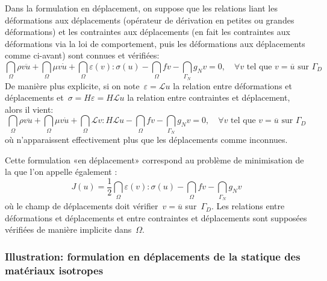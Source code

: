\medskip
Dans la formulation en déplacement, on suppose que les relations liant les déformations aux déplacements (opérateur de dérivation en petites ou grandes déformations) et les contraintes aux déplacements (en fait les contraintes aux déformations via la loi de comportement, puis les déformations aux déplacements comme ci-avant) sont connues et vérifiées:
\begin{equation}
\dint_\Omega \rho v\ddot{u} + \dint_\Omega \mu v\dot{u}
+\dint_\Omega \varepsilon(v):\sigma(u) - \dint_\Omega fv
-\dint_{\Gamma_N} g_N v =0, \quad \forall v \text{ tel que } v=\overline{u} \text{ sur } \Gamma_D
\end{equation}
De manière plus explicite, si on note~$\varepsilon=\mathcal{L}u$ la relation entre déformations et déplacements et~$\sigma = H\varepsilon = H\mathcal{L}u$ la relation entre contraintes et déplacement, alors il vient:
\begin{equation}
\dint_\Omega \rho v\ddot{u} + \dint_\Omega \mu v\dot{u}
+\dint_\Omega \mathcal{L}v:H\mathcal{L}u - \dint_\Omega fv
-\dint_{\Gamma_N} g_N v =0, \quad \forall v \text{ tel que } v=\overline{u} \text{ sur } \Gamma_D
\end{equation}
où n'apparaissent effectivement plus que les déplacements comme inconnues.


\medskip
Cette formulation «en déplacement» correspond au problème de minimisation de la  que l'on appelle également :
\begin{equation}
J(u)=
\frac12 \dint_\Omega \varepsilon(v):\sigma(u) - \dint_\Omega fv -
\dint_{\Gamma_N} g_N v
\end{equation}
où le champ de déplacements doit vérifier~$v=\overline{u}$ sur~$\Gamma_D$.
Les relations entre déformations et déplacements et entre contraintes et déplacements sont supposées vérifiées de manière implicite dans~$\Omega$.

\medskip
\subsubsection{Illustration: formulation en déplacements de la statique des matériaux isotropes}

